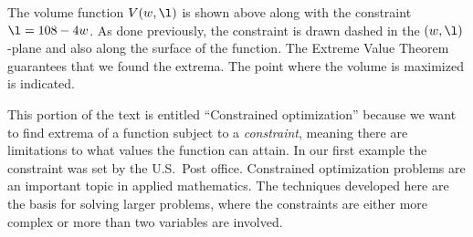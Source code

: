 \documentclass{ximera}
\begin{document}
\begin{example}
\begin{explanation}
\begin{image}
    \end{image}
    The volume function $V(w,\l)$ is shown above along with the
    constraint $\l = 108-4w$. As done previously, the constraint is
    drawn dashed in the $(w,\l)$-plane and also along the surface of
    the function. The Extreme Value Theorem guarantees that we found
    the extrema. The point where the volume is maximized is indicated.
  \end{explanation}
\end{example}



This portion of the text is entitled ``Constrained optimization''
because we want to find extrema of a function subject to a
\textit{constraint}, meaning there are limitations to what values the
function can attain. In our first example the constraint was set by
the U.S.\ Post office.  Constrained optimization problems are an
important topic in applied mathematics. The techniques developed here
are the basis for solving larger problems, where the constraints are
either more complex or more than two variables are involved.
\end{document}
